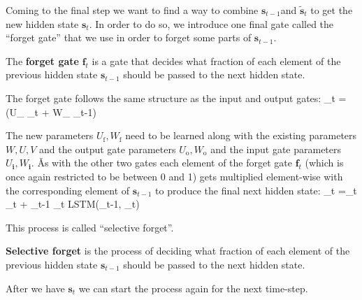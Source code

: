
Coming to the final step we want to find a way to combine $\boldsymbol{s}_{t-1}$and $\boldsymbol{\tilde{s}}_t$ to get
the new hidden state $\boldsymbol{s}_{t}$. In order to do so, we introduce one final gate called the ``forget gate''
that we
use in order to forget some parts of $\boldsymbol{s}_{t-1}$.

The \textbf{forget gate} $\boldsymbol{f}_{t}$ is a gate that decides what fraction of each element of the previous
hidden state $\boldsymbol{s}_{t-1}$ should be passed to the next hidden state.
\ed

The forget gate follows the same structure as the input and output gates:
\bse
{}_{t} = \sigma(U_{} _{t} + W_{} _{t-1})
\ese

The new parameters $U_{\text{f}}, W_{\text{f}}$ need to be learned along with the existing parameters $W, U, V$ and
the output gate parameters $U_{\text{o}}, W_{\text{o}}$ and the input gate parameters $U_{\boldsymbol{i}},
W_{\boldsymbol{i}}$. \v

As with the other two gates each element of the forget gate $\boldsymbol{f}_{t} $ (which is once again restricted to be
between 0 and 1) gets multiplied element-wise with the corresponding element of $\boldsymbol{s}_{t-1}$ to produce the
final next hidden state:
\bse
{}_{t} =_t \odot {}_{t} + _{t-1} \odot {}_{t}
\coloneqq LSTM(_{t-1}, _{t})
\ese

This process is called ``selective forget''.

\textbf{Selective forget} is the process of deciding what fraction of each element of the previous hidden state
$\boldsymbol{s}_{t-1}$ should be passed to the next hidden state.
\ed


After we have $\boldsymbol{s}_{t} $ we can start the process again for the next time-step.


